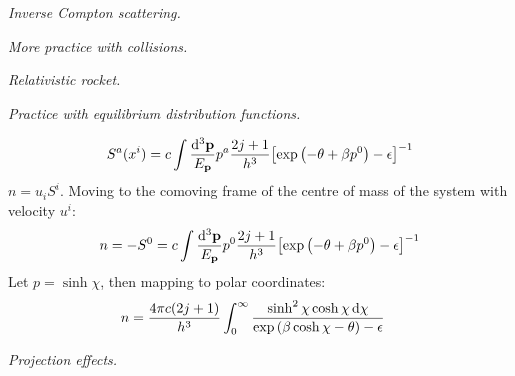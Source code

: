 \documentclass{report}
\begin{document}
\begin{subquests}
\begin{subquests}
		\item \emph{Inverse Compton scattering.}
	\end{subquests}
	

	\item \emph{More practice with collisions.}

	\item \emph{Relativistic rocket.}

	\item \emph{Practice with equilibrium distribution functions.}
	\begin{subquests}
		\item 		
		\begin{align*}
			S^a(x^i) = c \int \frac{\dd^3 \vb p}{E_{\vb p}} p^a \frac{2j+1}{h^3}\bqty{\exp\pqty{-\theta+\beta p^0} - \epsilon}^{-1}
		\end{align*}
		$n = u_i S^i$. Moving to the comoving frame of the centre of mass of the system with velocity $u^i$:
		\begin{align*}
			n & = -S^0 = c\int \frac{\dd^3 \vb p}{E_{\vb p}} p^0 \frac{2j+1}{h^3}\bqty{\exp\pqty{-\theta+\beta p^0} - \epsilon}^{-1} \\
		\end{align*}
		Let $p = \sinh \chi$, then mapping to polar coordinates:
		\begin{align*}
			n & = \frac{4\pi c(2j+1)}{h^3} \int_0^{\infty} \frac{\sinh^2 \chi \cosh \chi \dd{\chi}}{\exp\pqty{\beta\cosh\chi - \theta} - \epsilon}
		\end{align*}
	\end{subquests}

	\item \emph{Projection effects.}


\end{subquests}
\end{document}
